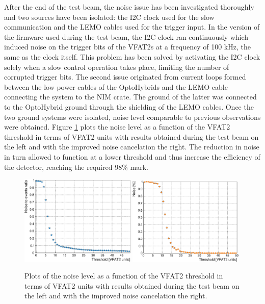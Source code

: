       After the end of the test beam, the noise issue has been investigated thoroughly and two sources have been isolated: the I2C clock used for the slow communication and the LEMO cables used for the trigger input. In the version of the firmware used during the test beam, the I2C clock ran continuously which induced noise on the trigger bits of the VFAT2s at a frequency of 100 kHz, the same as the clock itself. This problem has been solved by activating the I2C clock solely when a slow control operation takes place, limiting the number of corrupted trigger bits. The second issue originated from current loops formed between the low power cables of the OptoHybrids and the LEMO cable connecting the system to the NIM crate. The ground of the latter was connected to the OptoHybrid ground through the shielding of the LEMO cables. Once the two ground systems were isolated, noise level comparable to previous observations were obtained. Figure \ref{fig:II-3-noise-comp} plots the noise level as a function of the VFAT2 threshold in terms of VFAT2 units with results obtained during the test beam on the left and with the improved noise cancelation the right. The reduction in noise in turn allowed to function at a lower threshold and thus increase the efficiency of the detector, reaching the required 98\% mark. \\

      \begin{figure}[h!]
        \centering
        \includegraphics[width=0.49\textwidth]{img/plots/cThresholdScan_GEM0-crop}
        \includegraphics[width=0.49\textwidth]{img/plots/cThreshold_SBitsTK-crop}
        \caption{Plots of the noise level as a function of the VFAT2 threshold in terms of VFAT2 units with results obtained during the test beam on the left and with the improved noise cancelation the right.}
        \label{fig:II-3-noise-comp}
      \end{figure}

